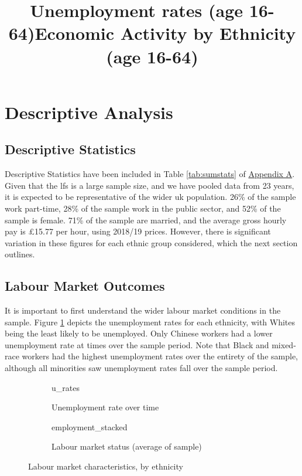 \documentclass[class=article, crop=false]{standalone}
\begin{document}
\section{Descriptive Analysis}
\label{sec:Descriptive Analysis}
\subsection{Descriptive Statistics}
\label{sec:Descriptive Statistics}
Descriptive Statistics have been included in Table \ref{tab:sumstats} of \hyperref[sec:appendixA]{Appendix A}. Given that the \acrshort{lfs} is a large sample size, and we have pooled data from 23 years, it is expected to be representative of the wider \acrshort{uk} population. 26\% of the sample work part-time, 28\% of the sample work in the public sector, and 52\% of the sample is female. 71\% of the sample are married, and the average gross hourly pay is £15.77 per hour, using 2018/19 prices. However, there is significant variation in these figures for each ethnic group considered, which the next section outlines. %

\subsection{Labour Market Outcomes}
\label{sec:Labour Market Outcomes}
It is important to first understand the wider labour market conditions in the sample. Figure \ref{fig:u_rates} depicts the unemployment rates for each ethnicity, with Whites being the least likely to be unemployed. Only Chinese workers had a lower unemployment rate at times over the sample period. Note that Black and mixed-race workers had the highest unemployment rates over the entirety of the sample, although all minorities saw unemployment rates fall over the sample period.
\begin{figure}[h]
\begin{subfigure}{0.5\textwidth}
\centering
    \title{Unemployment rates (age 16-64)}
    {u_rates}
    \caption{Unemployment rate over time}
    \label{fig:u_rates}
\end{subfigure}
\begin{subfigure}{0.5\textwidth}
\centering
    \title{Economic Activity by Ethnicity (age 16-64)}
    {employment_stacked}
    \caption{Labour market status (average of sample)}
    \label{fig:employment_stacked}
\end{subfigure}
\caption{Labour market characteristics, by ethnicity}
\label{fig:labour_market}
\end{figure}
\end{document}
